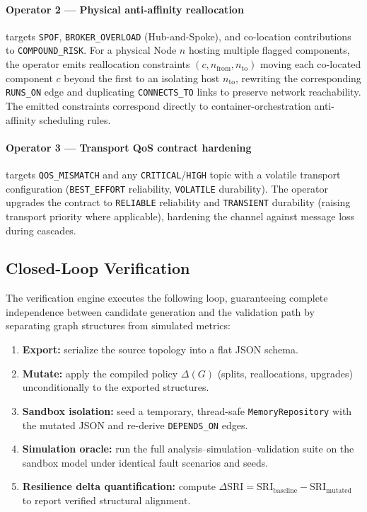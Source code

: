 \documentclass[11pt]{article}
\begin{document}
\paragraph{Operator 2 --- Physical anti-affinity reallocation} targets \texttt{SPOF},
\texttt{BROKER\_OVERLOAD} (Hub-and-Spoke), and co-location contributions to \texttt{COMPOUND\_RISK}.
For a physical Node $n$ hosting multiple flagged components, the operator emits reallocation
constraints $(c, n_{\text{from}}, n_{\text{to}})$ moving each co-located component $c$ beyond the
first to an isolating host $n_{\text{to}}$, rewriting the corresponding \texttt{RUNS\_ON} edge and
duplicating \texttt{CONNECTS\_TO} links to preserve network reachability. The emitted constraints
correspond directly to container-orchestration anti-affinity scheduling rules.

\paragraph{Operator 3 --- Transport QoS contract hardening} targets \texttt{QOS\_MISMATCH} and any
\texttt{CRITICAL}/\texttt{HIGH} topic with a volatile transport configuration (\texttt{BEST\_EFFORT}
reliability, \texttt{VOLATILE} durability). The operator upgrades the contract to \texttt{RELIABLE}
reliability and \texttt{TRANSIENT} durability (raising transport priority where applicable), hardening
the channel against message loss during cascades.

\subsection{Closed-Loop Verification}

The verification engine executes the following loop, guaranteeing complete independence between
candidate generation and the validation path by separating graph structures from simulated metrics:

\begin{enumerate}
\item \textbf{Export:} serialize the source topology into a flat JSON schema.
\item \textbf{Mutate:} apply the compiled policy $\Delta(G)$ (splits, reallocations, upgrades)
  unconditionally to the exported structures.
\item \textbf{Sandbox isolation:} seed a temporary, thread-safe \texttt{MemoryRepository} with the
  mutated JSON and re-derive \texttt{DEPENDS\_ON} edges.
\item \textbf{Simulation oracle:} run the full analysis--simulation--validation suite on the sandbox
  model under identical fault scenarios and seeds.
\item \textbf{Resilience delta quantification:} compute $\Delta\mathrm{SRI} =
  \mathrm{SRI}_{\text{baseline}} - \mathrm{SRI}_{\text{mutated}}$ to report verified structural
  alignment.
\end{enumerate}
\end{document}
